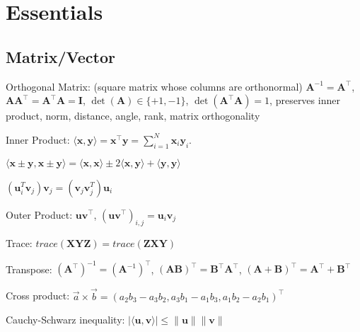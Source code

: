 \section{Essentials}
\subsection*{Matrix/Vector}
\begin{compactdesc}
	\item[Orthogonal Matrix:] (square matrix whose columns are orthonormal) $\mathbf{A}^{-1} = \mathbf{A}^\top$, $\mathbf{A} \mathbf{A}^\top = \mathbf{A}^\top \mathbf{A} = \mathbf{I}$, $\operatorname{det}(\mathbf{A}) \in \{+1, -1\}$, $\operatorname{det}(\mathbf{A}^\top \mathbf{A}) = 1$,
	preserves inner product, norm, distance, angle, rank, matrix orthogonality 
	
	\item[Inner Product:] $\langle \mathbf{x}, \mathbf{y} \rangle = \mathbf{x}^\top \mathbf{y} = \sum_{i=1}^{N} \mathbf{x}_i \mathbf{y}_i$.
	\begin{inparaitem}
		\item $\langle \mathbf{x} \pm \mathbf{y}, \mathbf{x} \pm \mathbf{y} \rangle = \langle \mathbf{x}, \mathbf{x} \rangle \pm 2 \langle \mathbf{x}, \mathbf{y} \rangle + \langle \mathbf{y}, \mathbf{y} \rangle$
		\item $(\mathbf{u}_i^T\mathbf{v}_j)\mathbf{v}_j = (\mathbf{v}_j\mathbf{v}_j^T)\mathbf{u}_i$
	\end{inparaitem}
	\item[Outer Product:] $\mathbf{u} \mathbf{v}^\top$, $(\mathbf{u} \mathbf{v}^\top)_{i, j} = \mathbf{u}_i \mathbf{v}_j$
    \item[Trace:] $\mathit{trace}(\mathbf{XYZ})=\mathit{trace}(\mathbf{ZXY})$
	\item[Transpose:] $(\mathbf{A}^\top)^{-1} = (\mathbf{A}^{-1})^\top$,  $(\mathbf{A}\mathbf{B})^\top= \mathbf{B}^\top\mathbf{A}^\top$, $(\mathbf{A}+\mathbf{B})^\top= \mathbf{A}^\top + \mathbf{B}^\top$
	\item[Cross product:] $\vec{a}\times\vec{b}=(a_2b_3-a_3b_2, a_3b_1-a_1b_3, a_1b_2-a_2b_1)^\top$
	\item[Cauchy-Schwarz inequality:] $|\langle\mathbf{u}, \mathbf{v}\rangle| \leq \|\mathbf{u}\|\|\mathbf{v}\|$
\end{compactdesc}

